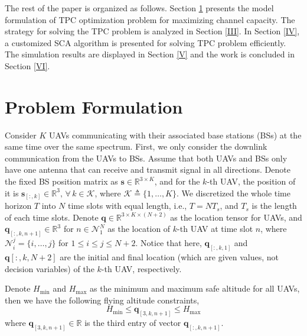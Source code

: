 \documentclass[10pt,final,conference]{IEEEtran}
\begin{document}
The rest of the paper is organized as follows. Section \ref{II} presents the model formulation of TPC optimization problem for maximizing channel capacity. The strategy for solving the TPC problem is analyzed in Section \ref{III}. In Section \ref{IV}, a customized SCA algorithm is presented for solving TPC problem efficiently. The simulation results are displayed in Section \ref{V} and the work is concluded in Section \ref{VI}.
\baselineskip

\section{Problem Formulation}\label{II}
Consider $K$ UAVs communicating with their associated base stations (BSs) at the same time over the same spectrum. First, we only consider the downlink communication from the UAVs to BSs. Assume that both UAVs and BSs only have one antenna that can receive and transmit signal in all directions. Denote the fixed BS position matrix as $\boldsymbol{s}\in\mathbb{R}^{3\times K}$, and for the $k$-th UAV, the position of it is $\boldsymbol{s}_{[:,k]}\in\mathbb{R}^3,\,\forall\,k\in\mathcal{K}$, where $\mathcal{K}\triangleq\{1,\ldots,K\}$. We discretized the whole time horizon $T$ into $N$ time slots with equal length, i.e., $T=NT_s$, and $T_s$ is the length of each time slots. Denote $\boldsymbol{q}\in\mathbb{R}^{3\times K\times (N+2)}$ as the location tensor for UAVs, and $\boldsymbol{q}_{[:,k,n+1]}\in\mathbb{R}^3$ for $n\in\mathcal{N}_1^N$ as the location of $k$-th UAV at time slot $n$, where $\mathcal{N}_i^j=\{i,\ldots,j\}$ for $1\leq i\leq j\leq N+2$. Notice that here, $\boldsymbol{q}_{[:,k,1]}$ and $\boldsymbol{q}[:,k,N+2]$ are the initial and final location (which are given values, not decision variables) of the $k$-th UAV, respectively. 

Denote $H_{\min}$ and $H_{\max}$ as the minimum and maximum safe altitude for all UAVs, then we have the following flying altitude constraints,
\begin{equation}\label{Eq1}
H_{\min}\leq\boldsymbol{q}_{[3,k,n+1]}\leq H_{\max}
\end{equation}
where $\boldsymbol{q}_{[3,k,n+1]}\in\mathbb{R}$ is the third entry of vector $\boldsymbol{q}_{[:,k,n+1]}$.
\end{document}
